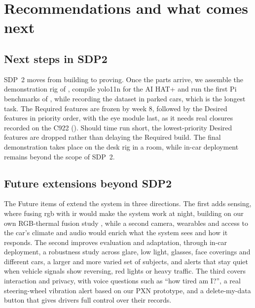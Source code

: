 \section{Recommendations and what comes next}
\subsection{Next steps in SDP2}

SDP~2 moves from building to proving. Once the parts arrive, we assemble the demonstration rig of , compile \gls{yolo}11n for the AI HAT+ and run the first Pi benchmarks of , while recording the dataset in parked cars, which is the longest task. The Required features are frozen by week 8, followed by the Desired features in priority order, with the eye module last, as it needs real closures recorded on the C922 (). Should time run short, the lowest-priority Desired features are dropped rather than delaying the Required build. The final demonstration takes place on the desk rig in a room, while in-car deployment remains beyond the scope of SDP~2.


\subsection{Future extensions beyond SDP2}
\label{sec:future}

The Future items of  extend the system in three directions. The first adds sensing, where fusing \gls{rgb} with \gls{ir} would make the system work at night, building on our own RGB-thermal fusion study \cite{rs4}, while a second camera, wearables and access to the car's climate and audio would enrich what the system sees and how it responds. The second improves evaluation and adaptation, through in-car deployment, a robustness study across glare, low light, glasses, face coverings and different cars, a larger and more varied set of subjects, and alerts that stay quiet when vehicle signals show reversing, red lights or heavy traffic. The third covers interaction and privacy, with voice questions such as ``how tired am I?'', a real steering-wheel vibration alert based on our PXN prototype, and a delete-my-data button that gives drivers full control over their records.
